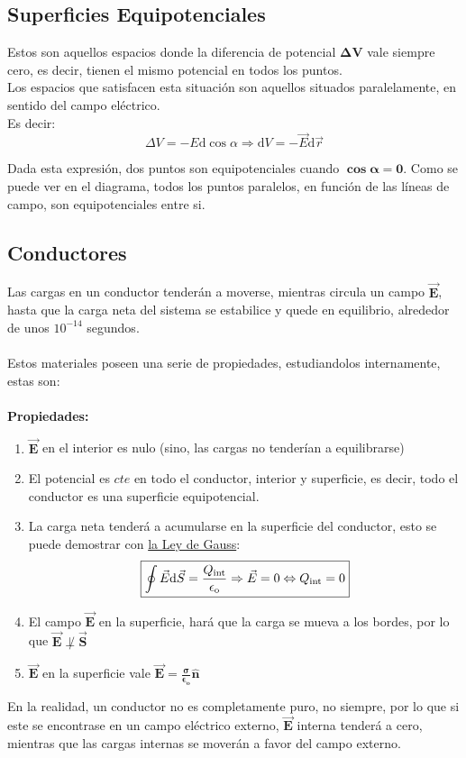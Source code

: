 \subsection{Superficies Equipotenciales}
\noindent Estos son aquellos espacios donde la diferencia de potencial \(\bm{\Delta V}\) vale siempre cero, es decir, tienen el mismo potencial en todos los puntos. \\
Los espacios que satisfacen esta situación son aquellos situados paralelamente, en sentido del campo eléctrico. \\ Es decir:
\[
        \boxed{\Delta V = - E \mathrm{d} \cos{\alpha} \Rightarrow \mathrm{d}V = - \vec{E}\mathrm{d}\vec{r}}
\]
\begin{wrapfigure}{r}{5cm}
        
\end{wrapfigure}
Dada esta expresión, dos puntos son equipotenciales cuando \(\bm{\cos{\bm{\alpha}} = 0}\). Como se puede ver en el diagrama, todos los puntos paralelos, en función de las líneas de campo, son equipotenciales entre si.
\subsection{Conductores}
\noindent Las cargas en un conductor tenderán a moverse, mientras circula un campo \(\bm{\vec{E}}\), hasta que la carga neta del sistema se estabilice y quede en equilibrio, alrededor de unos \(10^{-14}\) segundos.\\\\
Estos materiales poseen una serie de propiedades, estudiandolos internamente, estas son:\\\\
\hspace{3cm}\textbf{Propiedades:}
\begin{enumerate}
        \item \(\bm{\vec{E}}\) en el interior es nulo (sino, las cargas no tenderían a equilibrarse)
        \item  El potencial es \(cte\) en todo el conductor, interior y superficie, es decir, todo el conductor es una superficie equipotencial.
        \item La carga neta tenderá a acumularse en la superficie del conductor, esto se puede demostrar con \underline{la Ley de Gauss}:
              \[
                      \boxed{\oint \vec{E} \mathrm{d} \vec{S} = \frac{Q_{\textnormal{int}}}{\epsilon_{\textnormal{o}}} \Rightarrow \vec{E} = 0 \Leftrightarrow  Q_{\textnormal{int}} = 0}
              \]
        \item El campo \(\bm{\vec{E}}\) en la superficie, hará que la carga se mueva a los bordes, por lo que \(\bm{\vec{E} \not \perp \vec{S}}\)
        \item \(\bm{\vec{E}}\) en la superficie vale \(\bm{\vec{E} = \frac{\sigma}{\epsilon_o}\hat{n}}\)
\end{enumerate}
\vspace{0.5cm}
En la realidad, un conductor no es completamente puro, no siempre, por lo que si este se encontrase en un campo eléctrico externo, \(\bm{\vec{E}}\) interna tenderá a cero, mientras que las cargas internas se moverán a favor del campo externo.
